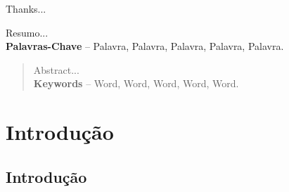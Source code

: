 \documentclass[]{politex}
\begin{document}
\capa
\falsafolhaderosto
\folhaderosto








\begin{agradecimentos}

Thanks...

\end{agradecimentos}




\begin{resumo}
Resumo...
%
\\[3\baselineskip]
%
\textbf{Palavras-Chave} -- Palavra, Palavra, Palavra, Palavra, Palavra.
\end{resumo}


\begin{abstract}
Abstract...
%
\\[3\baselineskip]
%
\textbf{Keywords} -- Word, Word, Word, Word, Word.
\end{abstract}


\listadefiguras
\listadetabelas

\sumario




\part{Introdução}
	
\chapter{Introdução}
\end{document}
